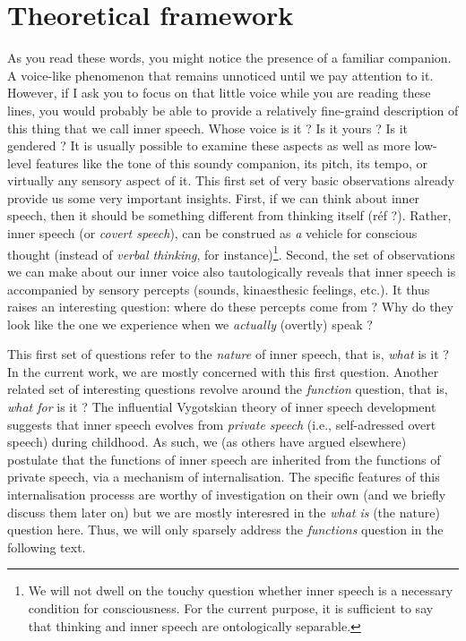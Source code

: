 \documentclass[a4paper,12pt,oneside,oldfontcommands]{memoir}
\let\rmarkdownfootnote\footnote%
\def\footnote{\protect\rmarkdownfootnote}
\newcommand{\initial}[1]{
	\lettrine[lines=3,lhang=0.33,nindent=0em]{
		\color{gray}
     		{\textsc{#1}}}{}}
\begin{document}
\chapter{Theoretical framework}\label{intro}

\initial{A}s you read these words, you might notice the presence of a
familiar companion. A voice-like phenomenon that remains unnoticed until
we pay attention to it. However, if I ask you to focus on that little
voice while you are reading these lines, you would probably be able to
provide a relatively fine-graind description of this thing that we call
inner speech. Whose voice is it ? Is it yours ? Is it gendered ? It is
usually possible to examine these aspects as well as more low-level
features like the tone of this soundy companion, its pitch, its tempo,
or virtually any sensory aspect of it. This first set of very basic
observations already provide us some very important insights. First, if
we can think about inner speech, then it should be something different
from thinking itself (réf ?). Rather, inner speech (or \emph{covert
speech}), can be construed as \emph{a} vehicle for conscious thought
(instead of \emph{verbal thinking}, for instance)\footnote{We will not
  dwell on the touchy question whether inner speech is a necessary
  condition for consciousness. For the current purpose, it is sufficient
  to say that thinking and inner speech are ontologically separable.}.
Second, the set of observations we can make about our inner voice also
tautologically reveals that inner speech is accompanied by sensory
percepts (sounds, kinaesthesic feelings, etc.). It thus raises an
interesting question: where do these percepts come from ? Why do they
look like the one we experience when we \emph{actually} (overtly) speak
?

This first set of questions refer to the \emph{nature} of inner speech,
that is, \emph{what} is it ? In the current work, we are mostly
concerned with this first question. Another related set of interesting
questions revolve around the \emph{function} question, that is,
\emph{what for} is it ? The influential Vygotskian theory of inner
speech development suggests that inner speech evolves from \emph{private
speech} (i.e., self-adressed overt speech) during childhood. As such, we
(as others have argued elsewhere) postulate that the functions of inner
speech are inherited from the functions of private speech, via a
mechanism of internalisation. The specific features of this
internalisation processs are worthy of investigation on their own (and
we briefly discuss them later on) but we are mostly interesred in the
\emph{what is} (the nature) question here. Thus, we will only sparsely
address the \emph{functions} question in the following text.
\end{document}
